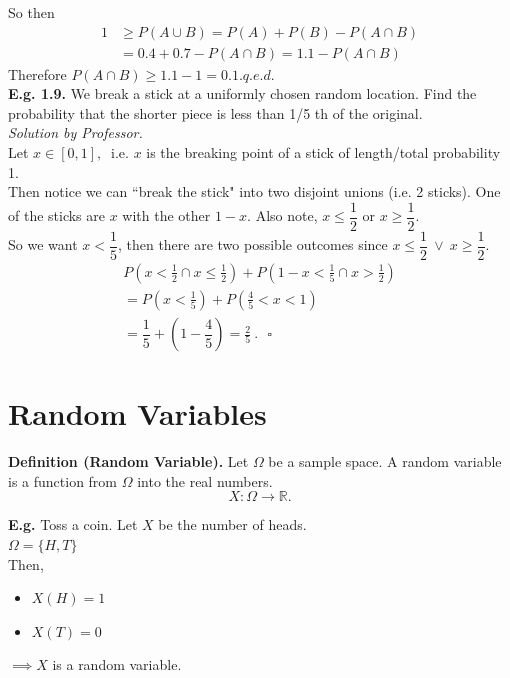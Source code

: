\documentclass[12pt]{book}
\begin{document}
\noindent So then
\begin{align*}
1 &\geq P(A\cup B ) = P(A)+ P(B) - P(A\cap B)\\
&= 0.4+0.7-P(A\cap B)=1.1-P(A\cap B)
\end{align*}
Therefore $P(A\cap B) \geq 1.1-1 = 0.1$.\hfill $q.e.d.$\\

\noindent \textbf{E.g. 1.9. } We break a stick at a uniformly chosen random location. Find the probability that the shorter piece is less than 1/5 th of the original.\\

\noindent \textit{Solution by Professor. }\\
Let $x\in [0,1],~$ i.e. $x$ is the breaking point of a stick of length/total probability 1.\\
Then notice we can ``break the stick" into two disjoint unions (i.e. 2 sticks). One of the sticks are $x$ with the other $1-x$. Also note, $x\leq \dfrac{1}{2}$ or $x \geq \dfrac{1}{2}$.\\

\noindent So we want $x< \dfrac{1}{5}$, then there are two possible outcomes since $x\leq \dfrac{1}{2}~\lor~x\geq \dfrac{1}{2}$.
\newpage
\begin{align*}
P\left(x<\frac{1}{2} \cap x\leq \frac{1}{2}\right)+P\left(1-x < \frac{1}{5} \cap x>\frac{1}{2}\right)\\
= P\left(x<\frac{1}{5}\right)+ P\left(\frac{4}{5}<x<1\right)\\
=\dfrac{1}{5}+\left(1-\dfrac{4}{5}\right)=\boxed{\frac{2}{5}}~.~~~\square
\end{align*}




\section{Random Variables}
\textbf{Definition (Random Variable). } Let $\Omega$ be a sample space. A random variable is a function from $\Omega$ into the real numbers.
$$X:\Omega \rightarrow \mathbb{R}.$$

\noindent \textbf{E.g. } Toss a coin. Let $X$ be the number of heads. \\
$\Omega=\{H,T\}$\\
Then, 
\begin{itemize}
\item $X(H)=1$
\item $X(T)=0$
\end{itemize}
$\implies X$ is a random variable.
\end{document}
